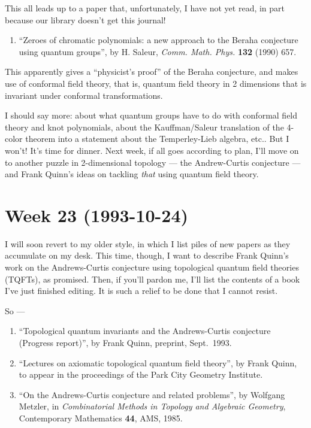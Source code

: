 \documentclass{article}
\def\tightlist{}
\begin{document}
This all leads up to a paper that, unfortunately, I have not yet read,
in part because our library doesn't get this journal!

\begin{enumerate}
\def\labelenumi{\arabic{enumi})}
\setcounter{enumi}{4}
\tightlist
\item
  ``Zeroes of chromatic polynomials: a new approach to the Beraha
  conjecture using quantum groups'', by H. Saleur, \emph{Comm. Math.
  Phys.} \textbf{132} (1990) 657.
\end{enumerate}

This apparently gives a ``physicist's proof'' of the Beraha conjecture,
and makes use of conformal field theory, that is, quantum field theory
in 2 dimensions that is invariant under conformal transformations.

I should say more: about what quantum groups have to do with conformal
field theory and knot polynomials, about the Kauffman/Saleur translation
of the 4-color theorem into a statement about the Temperley-Lieb
algebra, etc.. But I won't! It's time for dinner. Next week, if all goes
according to plan, I'll move on to another puzzle in 2-dimensional
topology --- the Andrew-Curtis conjecture --- and Frank Quinn's ideas on
tackling \emph{that} using quantum field theory.
\hypertarget{week23}{%
\section{Week 23 (1993-10-24)}\label{week23}}

I will soon revert to my older style, in which I list piles of new
papers as they accumulate on my desk. This time, though, I want to
describe Frank Quinn's work on the Andrews-Curtis conjecture using
topological quantum field theories (TQFTs), as promised. Then, if you'll
pardon me, I'll list the contents of a book I've just finished editing.
It is such a relief to be done that I cannot resist.

So ---

\begin{enumerate}
\def\labelenumi{\arabic{enumi})}
\item
  ``Topological quantum invariants and the Andrews-Curtis conjecture
  (Progress report)'', by Frank Quinn, preprint, Sept.~1993.
\item
  ``Lectures on axiomatic topological quantum field theory'', by Frank
  Quinn, to appear in the proceedings of the Park City Geometry
  Institute.
\item
  ``On the Andrews-Curtis conjecture and related problems'', by Wolfgang
  Metzler, in \emph{Combinatorial Methods in Topology and Algebraic
  Geometry}, Contemporary Mathematics \textbf{44}, AMS, 1985.
\end{enumerate}
\end{document}
